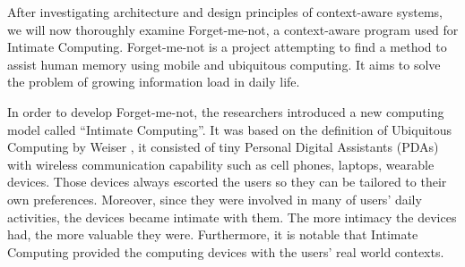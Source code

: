 After investigating architecture and design principles of context-aware systems, we will now thoroughly examine Forget-me-not, a context-aware program used for Intimate Computing. Forget-me-not \cite{lamming1994forget} is a project attempting to find a method to assist human memory using mobile and ubiquitous computing. It aims to solve the problem of growing information load in daily life.


In order to develop Forget-me-not, the researchers introduced a new computing model called ``Intimate Computing''. It was based on the definition of Ubiquitous Computing by Weiser \cite{weiser1991computer}, it consisted of tiny Personal Digital Assistants (PDAs) with wireless communication capability such as cell phones, laptops, wearable devices. Those devices always escorted the users so they can be tailored to their own preferences. Moreover, since they were involved in many of users' daily activities, the devices became intimate with them. The more intimacy the devices had, the more valuable they were. Furthermore, it is notable that Intimate Computing provided the computing devices with the users' real world contexts.

